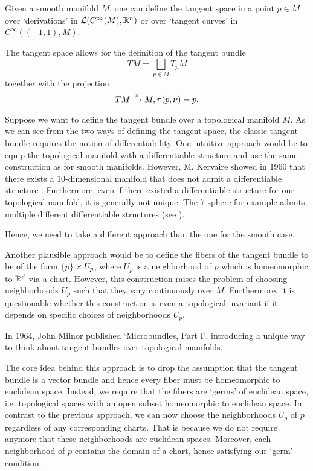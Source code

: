 \begin{myparagraph}
    Given a smooth manifold $M$,
    one can define the tangent space
    in a point $p \in M$ over `derivations' in $\mathcal{L}(C^\infty(M), \mathbb{R}^n)$
    or over `tangent curves' in $C^\infty((-1, 1), M)$.

    The tangent space allows for the definition of the tangent bundle
    \[ TM = \bigsqcup_{p \in M} T_p M\]
    together with the projection
    \[ TM \xrightarrow{\pi} M, \pi(p, \nu) = p. \]

    Suppose we want to define the tangent bundle over a topological manifold $M$.
    As we can see from the two ways of defining the tangent space,
    the classic tangent bundle requires the notion of differentiability.
    One intuitive approach would be to equip the topological manifold
    with a differentiable structure and use the same construction as for smooth manifolds.
    However, M. Kervaire showed in 1960 that there exists a $10$-dimensional manifold
    that does not admit a differentiable structure \cite{kervaire}.
    Furthermore, even if there existed a differentiable structure for our topological manifold,
    it is generally not unique. The $7$-sphere for example admits
    multiple different differentiable structures (see \cite{milnor7sphere}).

    Hence,
    we need to take a different approach than the one for the smooth case.
    
    Another plausible approach would be to define the fibers of the tangent bundle
    to be of the form $\{p\} \times U_p$,
    where $U_p$ is a neighborhood of $p$ which is
    homeomorphic to $\mathbb{R}^d$ via a chart.
    However, this construction raises the problem
    of choosing neighborhoods $U_p$
    such that they vary continuously over $M$.
    Furthermore,
    it is questionable whether this construction is even a topological
    invariant if it depends on specific choices of neighborhoods $U_p$.

    In 1964, John Milnor published `Microbundles, Part I',
    introducing a unique way to think
    about tangent bundles over topological manifolds.

    The core idea behind this approach is
    to drop the assumption
    that the tangent bundle is a vector bundle and hence
    every fiber must be homeomorphic to euclidean space.
    Instead, we require that the fibers are `germs' of euclidean space,
    i.e. topological spaces with an open subset homeomorphic to euclidean space.
    In contrast to the previous approach,
    we can now choose the neighborhoods $U_p$ of $p$ regardless of any corresponding charts.
    That is because we do not require anymore that these neighborhoods are euclidean spaces.
    Moreover, each neighborhood of $p$ contains
    the domain of a chart, hence satisfying our `germ' condition.


\end{myparagraph}

